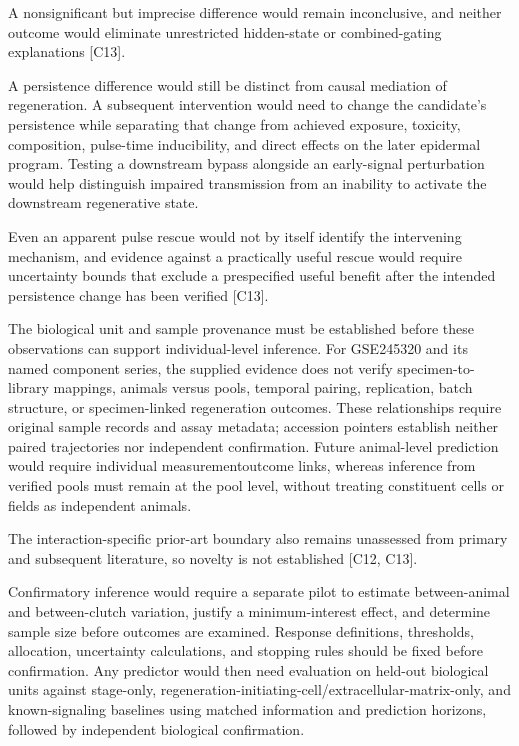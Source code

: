 \documentclass[11pt]{article}
\begin{document}
A nonsignificant but imprecise difference would remain inconclusive, and neither outcome would eliminate unrestricted hidden-state or combined-gating explanations [C13].

A persistence difference would still be distinct from causal mediation of regeneration. A subsequent intervention would need to change the candidate\textquoteright{}s persistence while separating that change from achieved exposure, toxicity, composition, pulse-time inducibility, and direct effects on the later epidermal program. Testing a downstream bypass alongside an early-signal perturbation would help distinguish impaired transmission from an inability to activate the downstream regenerative state.

Even an apparent pulse rescue would not by itself identify the intervening mechanism, and evidence against a practically useful rescue would require uncertainty bounds that exclude a prespecified useful benefit after the intended persistence change has been verified [C13].

The biological unit and sample provenance must be established before these observations can support individual-level inference. For GSE245320 and its named component series, the supplied evidence does not verify specimen-to-library mappings, animals versus pools, temporal pairing, replication, batch structure, or specimen-linked regeneration outcomes. These relationships require original sample records and assay metadata; accession pointers establish neither paired trajectories nor independent confirmation. Future animal-level prediction would require individual measurement\textendash{}outcome links, whereas inference from verified pools must remain at the pool level, without treating constituent cells or fields as independent animals.

The interaction-specific prior-art boundary also remains unassessed from primary and subsequent literature, so novelty is not established [C12, C13].

Confirmatory inference would require a separate pilot to estimate between-animal and between-clutch variation, justify a minimum-interest effect, and determine sample size before outcomes are examined. Response definitions, thresholds, allocation, uncertainty calculations, and stopping rules should be fixed before confirmation. Any predictor would then need evaluation on held-out biological units against stage-only, regeneration-initiating-cell/extracellular-matrix-only, and known-signaling baselines using matched information and prediction horizons, followed by independent biological confirmation.
\end{document}
